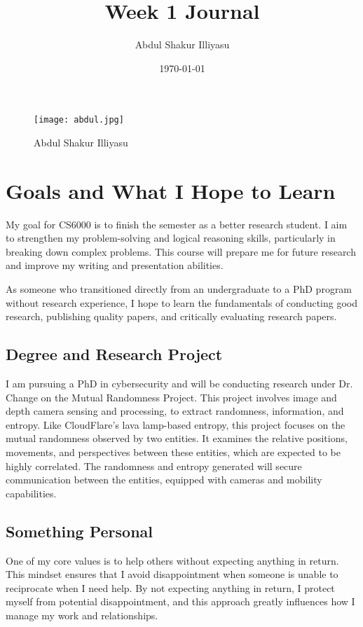 \documentclass{article}
\title{Week 1 Journal}
\author{Abdul Shakur Illiyasu}
\date{\today}
\begin{document}
\maketitle

\begin{figure}[ht]
    \centering
    \texttt{[image: abdul.jpg]}
    \caption{Abdul Shakur Illiyasu}
    \label{fig: abdul.jpg}
\end{figure}

\section{Goals and What I Hope to Learn}

My goal for CS6000 is to finish the semester as a better research student. I aim to strengthen my problem-solving and logical reasoning skills, particularly in breaking down complex problems. This course will prepare me for future research and improve my writing and presentation abilities.

As someone who transitioned directly from an undergraduate to a PhD program without research experience, I hope to learn the fundamentals of conducting good research, publishing quality papers, and critically evaluating research papers.

\subsection{Degree and Research Project}
I am pursuing a PhD in cybersecurity and will be conducting research under Dr. Change on the Mutual Randomness Project. This project involves image and depth camera sensing and processing, to extract randomness, information, and entropy. Like CloudFlare’s lava lamp-based entropy, this project focuses on the mutual randomness observed by two entities. It examines the relative positions, movements, and perspectives between these entities, which are expected to be highly correlated. The randomness and entropy generated will secure communication between the entities, equipped with cameras and mobility capabilities.

\subsection {Something Personal}
One of my core values is to help others without expecting anything in return. This mindset ensures that I avoid disappointment when someone is unable to reciprocate when I need help. By not expecting anything in return, I protect myself from potential disappointment, and this approach greatly influences how I manage my work and relationships.
\end{document}
